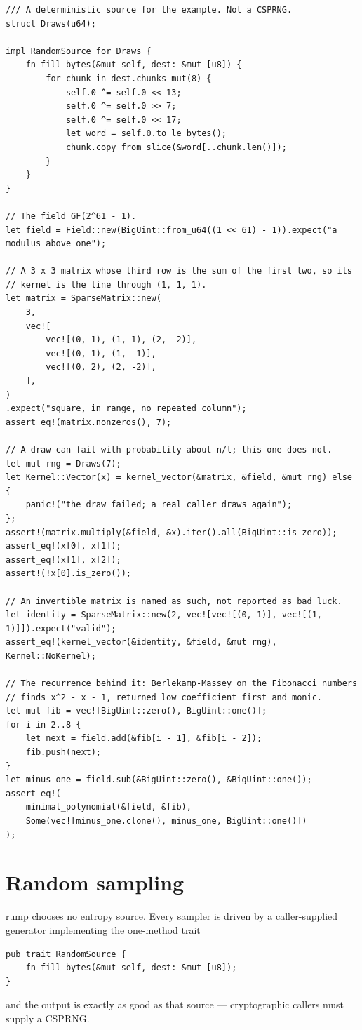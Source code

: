 \documentclass[11pt]{article}
\begin{document}
\begin{lstlisting}
/// A deterministic source for the example. Not a CSPRNG.
struct Draws(u64);

impl RandomSource for Draws {
    fn fill_bytes(&mut self, dest: &mut [u8]) {
        for chunk in dest.chunks_mut(8) {
            self.0 ^= self.0 << 13;
            self.0 ^= self.0 >> 7;
            self.0 ^= self.0 << 17;
            let word = self.0.to_le_bytes();
            chunk.copy_from_slice(&word[..chunk.len()]);
        }
    }
}

// The field GF(2^61 - 1).
let field = Field::new(BigUint::from_u64((1 << 61) - 1)).expect("a modulus above one");

// A 3 x 3 matrix whose third row is the sum of the first two, so its
// kernel is the line through (1, 1, 1).
let matrix = SparseMatrix::new(
    3,
    vec![
        vec![(0, 1), (1, 1), (2, -2)],
        vec![(0, 1), (1, -1)],
        vec![(0, 2), (2, -2)],
    ],
)
.expect("square, in range, no repeated column");
assert_eq!(matrix.nonzeros(), 7);

// A draw can fail with probability about n/l; this one does not.
let mut rng = Draws(7);
let Kernel::Vector(x) = kernel_vector(&matrix, &field, &mut rng) else {
    panic!("the draw failed; a real caller draws again");
};
assert!(matrix.multiply(&field, &x).iter().all(BigUint::is_zero));
assert_eq!(x[0], x[1]);
assert_eq!(x[1], x[2]);
assert!(!x[0].is_zero());

// An invertible matrix is named as such, not reported as bad luck.
let identity = SparseMatrix::new(2, vec![vec![(0, 1)], vec![(1, 1)]]).expect("valid");
assert_eq!(kernel_vector(&identity, &field, &mut rng), Kernel::NoKernel);

// The recurrence behind it: Berlekamp-Massey on the Fibonacci numbers
// finds x^2 - x - 1, returned low coefficient first and monic.
let mut fib = vec![BigUint::zero(), BigUint::one()];
for i in 2..8 {
    let next = field.add(&fib[i - 1], &fib[i - 2]);
    fib.push(next);
}
let minus_one = field.sub(&BigUint::zero(), &BigUint::one());
assert_eq!(
    minimal_polynomial(&field, &fib),
    Some(vec![minus_one.clone(), minus_one, BigUint::one()])
);
\end{lstlisting}

\section{Random sampling}
\label{sec:random}

rump chooses no entropy source. Every sampler is driven by a
caller-supplied generator implementing the one-method trait
\begin{lstlisting}
pub trait RandomSource {
    fn fill_bytes(&mut self, dest: &mut [u8]);
}
\end{lstlisting}
and the output is exactly as good as that source --- cryptographic callers
must supply a CSPRNG.
\end{document}
